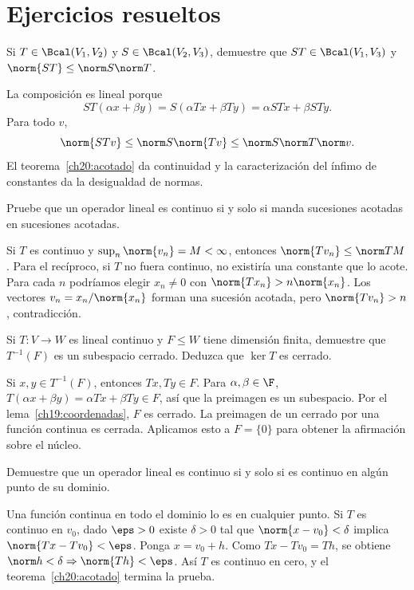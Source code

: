 \section{Ejercicios resueltos}

\begin{ejercicio}
Si $T\in\Bcal(V_1,V_2)$ y $S\in\Bcal(V_2,V_3)$, demuestre que $ST\in\Bcal(V_1,V_3)$ y $\norm{ST}\leq\norm S\norm T$.
\end{ejercicio}
\begin{solucion}
La composición es lineal porque
\[
 ST(\alpha x+\beta y)=S(\alpha Tx+\beta Ty)=\alpha STx+\beta STy.
\]
Para todo $v$,
\[
 \norm{STv}\leq\norm S\norm{Tv}\leq\norm S\norm T\norm v.
\]
El teorema~\ref{ch20:acotado} da continuidad y la caracterización del ínfimo de constantes da la desigualdad de normas.
\end{solucion}

\begin{ejercicio}
Pruebe que un operador lineal es continuo si y solo si manda sucesiones acotadas en sucesiones acotadas.
\end{ejercicio}
\begin{solucion}
Si $T$ es continuo y $\sup_n\norm{v_n}=M<\infty$, entonces $\norm{Tv_n}\leq\norm T M$. Para el recíproco, si $T$ no fuera continuo, no existiría una constante que lo acote. Para cada $n$ podríamos elegir $x_n\ne0$ con $\norm{Tx_n}>n\norm{x_n}$. Los vectores $v_n=x_n/\norm{x_n}$ forman una sucesión acotada, pero $\norm{Tv_n}>n$, contradicción.
\end{solucion}

\begin{ejercicio}
Si $T:V\to W$ es lineal continuo y $F\leq W$ tiene dimensión finita, demuestre que $T^{-1}(F)$ es un subespacio cerrado. Deduzca que $\ker T$ es cerrado.
\end{ejercicio}
\begin{solucion}
Si $x,y\in T^{-1}(F)$, entonces $Tx,Ty\in F$. Para $\alpha,\beta\in\F$, $T(\alpha x+\beta y)=\alpha Tx+\beta Ty\in F$, así que la preimagen es un subespacio. Por el lema~\ref{ch19:coordenadas}, $F$ es cerrado. La preimagen de un cerrado por una función continua es cerrada. Aplicamos esto a $F=\{0\}$ para obtener la afirmación sobre el núcleo.
\end{solucion}

\begin{ejercicio}
Demuestre que un operador lineal es continuo si y solo si es continuo en algún punto de su dominio.
\end{ejercicio}
\begin{solucion}
Una función continua en todo el dominio lo es en cualquier punto. Si $T$ es continuo en $v_0$, dado $\eps>0$ existe $\delta>0$ tal que $\norm{x-v_0}<\delta$ implica $\norm{Tx-Tv_0}<\eps$. Ponga $x=v_0+h$. Como $Tx-Tv_0=Th$, se obtiene $\norm h<\delta\Rightarrow\norm{Th}<\eps$. Así $T$ es continuo en cero, y el teorema~\ref{ch20:acotado} termina la prueba.
\end{solucion}

